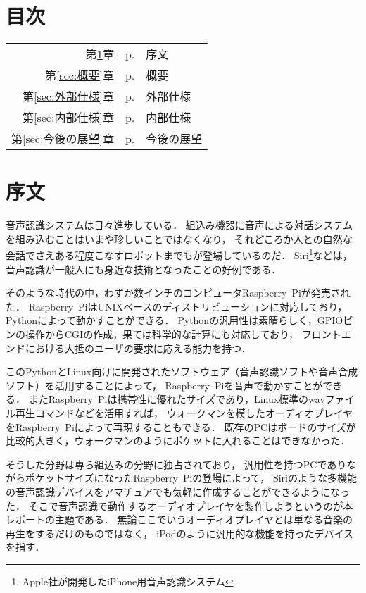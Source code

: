 \documentclass{jsarticle}
\begin{document}
\begin{multicols}{2}

\section*{目次}
\label{sec:目次}
\label{目次}
\begin{tabular}{rrl}
第\ref{sec:序文}章 & p.\pageref{序文} & 序文 \\
第\ref{sec:概要}章 & p.\pageref{概要} & 概要 \\
第\ref{sec:外部仕様}章 & p.\pageref{外部仕様} & 外部仕様 \\
第\ref{sec:内部仕様}章 & p.\pageref{内部仕様} & 内部仕様 \\
第\ref{sec:今後の展望}章 & p.\pageref{今後の展望} & 今後の展望
\end{tabular}

\section{序文}
\label{sec:序文}
\label{序文}

音声認識システムは日々進歩している．
組込み機器に音声による対話システムを組み込むことはいまや珍しいことではなくなり，
それどころか人との自然な会話でさえある程度こなすロボットまでもが登場しているのだ．
Siri\footnote{Apple社が開発したiPhone用音声認識システム}などは，
音声認識が一般人にも身近な技術となったことの好例である．

そのような時代の中，わずか数インチのコンピュータRaspberry\ Piが発売された．
Raspberry\ PiはUNIXベースのディストリビューションに対応しており，Pythonによって動かすことができる．
Pythonの汎用性は素晴らしく，GPIOピンの操作からCGIの作成，果ては科学的な計算にも対応しており，
フロントエンドにおける大抵のユーザの要求に応える能力を持つ．

このPythonとLinux向けに開発されたソフトウェア（音声認識ソフトや音声合成ソフト）を活用することによって，
Raspberry\ Piを音声で動かすことができる．
またRaspberry\ Piは携帯性に優れたサイズであり，Linux標準のwavファイル再生コマンドなどを活用すれば，
ウォークマンを模したオーディオプレイヤをRaspberry\ Piによって再現することもできる．
既存のPCはボードのサイズが比較的大きく，ウォークマンのようにポケットに入れることはできなかった．

そうした分野は専ら組込みの分野に独占されており，
汎用性を持つPCでありながらポケットサイズになったRaspberry\ Piの登場によって，
Siriのような多機能の音声認識デバイスをアマチュアでも気軽に作成することができるようになった．
そこで音声認識で動作するオーディオプレイヤを製作しようというのが本レポートの主題である．
無論ここでいうオーディオプレイヤとは単なる音楽の再生をするだけのものではなく，
iPodのように汎用的な機能を持ったデバイスを指す．


\end{multicols}
\end{document}
